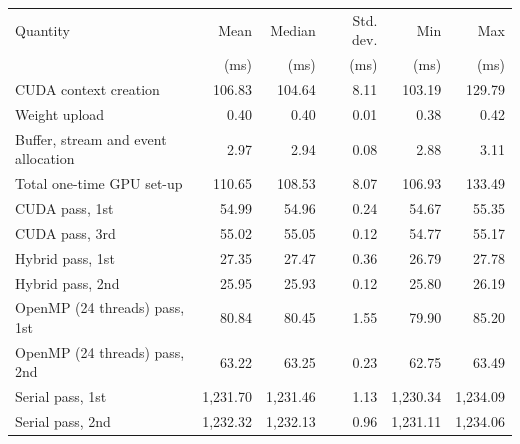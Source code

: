 \begin{tabular}{lrrrrr}
\toprule
Quantity & Mean & Median & Std. dev. & Min & Max \\
 & (ms) & (ms) & (ms) & (ms) & (ms) \\
\midrule
CUDA context creation & 106.83 & 104.64 & 8.11 & 103.19 & 129.79 \\
Weight upload & 0.40 & 0.40 & 0.01 & 0.38 & 0.42 \\
Buffer, stream and event allocation & 2.97 & 2.94 & 0.08 & 2.88 & 3.11 \\
Total one-time GPU set-up & 110.65 & 108.53 & 8.07 & 106.93 & 133.49 \\
CUDA pass, 1st & 54.99 & 54.96 & 0.24 & 54.67 & 55.35 \\
CUDA pass, 3rd & 55.02 & 55.05 & 0.12 & 54.77 & 55.17 \\
Hybrid pass, 1st & 27.35 & 27.47 & 0.36 & 26.79 & 27.78 \\
Hybrid pass, 2nd & 25.95 & 25.93 & 0.12 & 25.80 & 26.19 \\
OpenMP (24 threads) pass, 1st & 80.84 & 80.45 & 1.55 & 79.90 & 85.20 \\
OpenMP (24 threads) pass, 2nd & 63.22 & 63.25 & 0.23 & 62.75 & 63.49 \\
Serial pass, 1st & 1{,}231.70 & 1{,}231.46 & 1.13 & 1{,}230.34 & 1{,}234.09 \\
Serial pass, 2nd & 1{,}232.32 & 1{,}232.13 & 0.96 & 1{,}231.11 & 1{,}234.06 \\
\bottomrule
\end{tabular}
